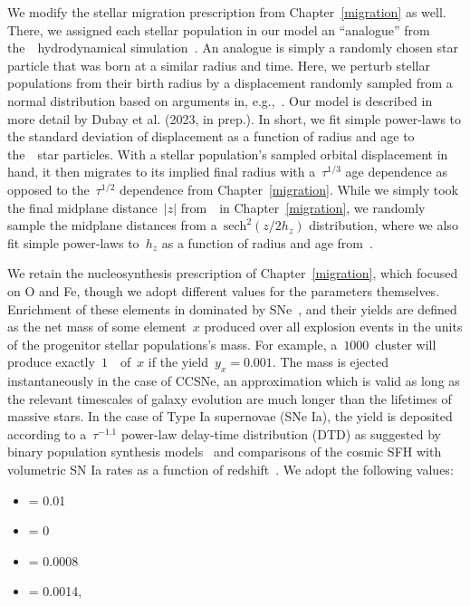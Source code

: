 We modify the stellar migration prescription from Chapter~\ref{migration} as
well.
There, we assigned each stellar population in our model an ``analogue'' from
the~\hsim~hydrodynamical simulation~\citep{Christensen2012, Loebman2012,
Loebman2014, Zolotov2012, Brooks2014}.
An analogue is simply a randomly chosen star particle that was born at a
similar radius and time.
Here, we perturb stellar populations from their birth radius by a displacement
randomly sampled from a normal distribution based on arguments in,
e.g.,~\citet{Frankel2018}.
Our model is described in more detail by Dubay et al. (2023, in prep.). 
In short, we fit simple power-laws to the standard deviation of displacement
as a function of radius and age to the~\hsim~star particles.
With a stellar population's sampled orbital displacement in hand, it then
migrates to its implied final radius with a~$\tau^{1/3}$ age dependence as
opposed to the~$\tau^{1/2}$ dependence from Chapter~\ref{migration}.
While we simply took the final midplane distance~$\left|z\right|$ from~\hsim~in
Chapter~\ref{migration}, we randomly sample the midplane distances from
a~$\text{sech}^2(z / 2h_z)$ distribution, where we also fit simple power-laws
to~$h_z$ as a function of radius and age from~\hsim.
\par
We retain the nucleosynthesis prescription of Chapter~\ref{migration}, which
focused on O and Fe, though we adopt different values for the parameters
themselves.
Enrichment of these elements in dominated by SNe~\citep[e.g.,][]{Johnson2019},
and their yields are defined as the net mass of some element~$x$ produced over
all explosion events in the units of the progenitor stellar populations's mass.
For example, a~$1000$~\msun cluster will produce exactly~$1$~\msun~of~$x$ if
the yield~$y_x = 0.001$.
The mass is ejected instantaneously in the case of CCSNe, an approximation
which is valid as long as the relevant timescales of galaxy evolution are
much longer than the lifetimes of massive stars.
In the case of Type Ia supernovae (SNe Ia), the yield is deposited according to
a~$\tau^{-1.1}$ power-law delay-time distribution (DTD) as suggested by
binary population synthesis models~\citep{Greggio2005, Toonen2012,
Maoz2014} and comparisons of the cosmic SFH with volumetric SN Ia rates as a
function of redshift~\citep{Maoz2012a, Maoz2012b, Graur2013, Graur2014}.
We adopt the following values:
\begin{itemize}

	\item {} = 0.01

	\item {} = 0

	\item {} = 0.0008

	\item {} = 0.0014,

\end{itemize}

